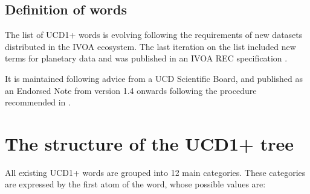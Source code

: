 \documentclass[11pt,a4paper]{ivoa}
\begin{document}
\subsection{Definition of words}
\label{sec:words}

The list of UCD1+ words is evolving following the requirements of new datasets distributed in the 
IVOA ecosystem. The last iteration on the list included new terms for planetary data and was 
published in an IVOA REC specification \citep{2018ivoa.spec.0527PM}.

It is maintained following advice from a UCD Scientific Board, and published as an Endorsed Note 
from version 1.4 onwards following the procedure recommended in \citep{2019ivoa.spec.1007G}. 

\section{The structure of the UCD1+ tree}
All existing UCD1+ words are grouped into 12 main categories. These categories are expressed by the 
first atom of the word, whose possible values are:
\end{document}
